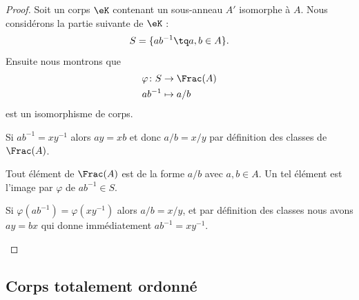 \begin{proof}
    Soit un corps \( \eK\) contenant un sous-anneau \( A'\) isomorphe à \( A\). Nous considérons la partie suivante de \( \eK\) :
    \begin{equation}
        S=\{ ab^{-1}\tq a,b\in A \}.
    \end{equation}
    Ensuite nous montrons que
    \begin{equation}
        \begin{aligned}
            \varphi\colon S&\to \Frac(A) \\
            ab^{-1}&\mapsto a/b
        \end{aligned}
    \end{equation}
    est un isomorphisme de corps.

    \begin{subproof}
        \item[Bien définie]

            Si \( ab^{-1}=xy^{-1}\) alors \( ay=xb\) et donc \( a/b=x/y\) par définition des classes de \( \Frac(A)\).

        \item[Surjectif]

            Tout élément de \( \Frac(A)\) est de la forme \( a/b\) avec \( a,b\in A\). Un tel élément est l'image par \( \varphi\) de \( ab^{-1}\in S\).

        \item[Injectif]

            Si \( \varphi(ab^{-1})=\varphi(xy^{-1})\) alors \( a/b=x/y\), et par définition des classes nous avons \( ay=bx\) qui donne immédiatement \( ab^{-1}=xy^{-1}\).
    \end{subproof}
\end{proof}

\subsection{Corps totalement ordonné}

